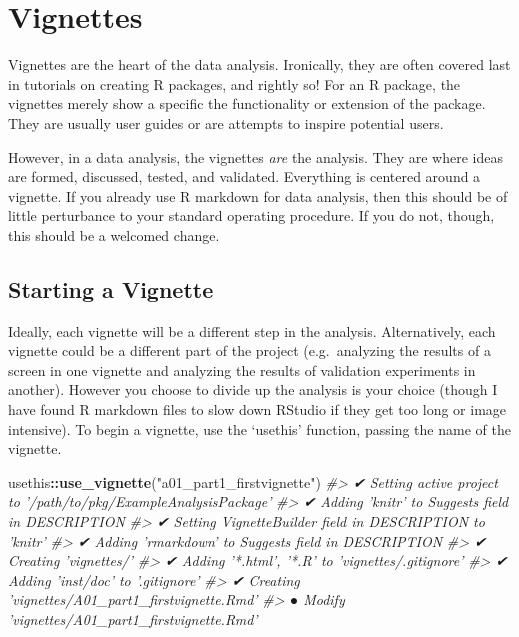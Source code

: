 \documentclass[]{book}
\newenvironment{Shaded}{\begin{snugshade}}{\end{snugshade}}
\newcommand{\CommentTok}[1]{\textcolor[rgb]{0.56,0.35,0.01}{\textit{#1}}}
\newcommand{\KeywordTok}[1]{\textcolor[rgb]{0.13,0.29,0.53}{\textbf{#1}}}
\newcommand{\NormalTok}[1]{#1}
\newcommand{\OperatorTok}[1]{\textcolor[rgb]{0.81,0.36,0.00}{\textbf{#1}}}
\newcommand{\StringTok}[1]{\textcolor[rgb]{0.31,0.60,0.02}{#1}}
\begin{document}
\hypertarget{vignettes}{%
\section{Vignettes}\label{vignettes}}

Vignettes are the heart of the data analysis. Ironically, they are often covered last in tutorials on creating R packages, and rightly so! For an R package, the vignettes merely show a specific the functionality or extension of the package. They are usually user guides or are attempts to inspire potential users.

However, in a data analysis, the vignettes \emph{are} the analysis. They are where ideas are formed, discussed, tested, and validated. Everything is centered around a vignette. If you already use R markdown for data analysis, then this should be of little perturbance to your standard operating procedure. If you do not, though, this should be a welcomed change.

\hypertarget{starting-a-vignette}{%
\subsection{Starting a Vignette}\label{starting-a-vignette}}

Ideally, each vignette will be a different step in the analysis. Alternatively, each vignette could be a different part of the project (e.g.~analyzing the results of a screen in one vignette and analyzing the results of validation experiments in another). However you choose to divide up the analysis is your choice (though I have found R markdown files to slow down RStudio if they get too long or image intensive). To begin a vignette, use the `usethis' function, passing the name of the vignette.

\begin{Shaded}
\begin{Highlighting}[]
\NormalTok{usethis}\OperatorTok{::}\KeywordTok{use_vignette}\NormalTok{(}\StringTok{"a01_part1_firstvignette"}\NormalTok{)}
\CommentTok{#> ✔ Setting active project to '/path/to/pkg/ExampleAnalysisPackage'}
\CommentTok{#> ✔ Adding 'knitr' to Suggests field in DESCRIPTION}
\CommentTok{#> ✔ Setting VignetteBuilder field in DESCRIPTION to 'knitr'}
\CommentTok{#> ✔ Adding 'rmarkdown' to Suggests field in DESCRIPTION}
\CommentTok{#> ✔ Creating 'vignettes/'}
\CommentTok{#> ✔ Adding '*.html', '*.R' to 'vignettes/.gitignore'}
\CommentTok{#> ✔ Adding 'inst/doc' to '.gitignore'}
\CommentTok{#> ✔ Creating 'vignettes/A01_part1_firstvignette.Rmd'}
\CommentTok{#> ● Modify 'vignettes/A01_part1_firstvignette.Rmd'}
\end{Highlighting}
\end{Shaded}
\end{document}
